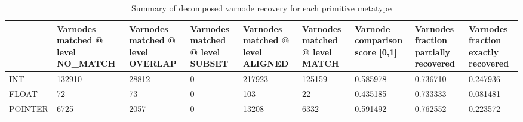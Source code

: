 \begin{table}[t]
\centering
\caption{Summary of decomposed varnode recovery for each primitive metatype}
\label{table:metatype-recovery-summary-with-levels-decomposed}
\begin{tabular}{lp{2.2cm}p{2.2cm}p{2.2cm}p{2.2cm}p{2.2cm}p{2.2cm}p{2.2cm}p{2.2cm}}
\toprule
{} &  Varnodes matched @ level NO\_MATCH &  Varnodes matched @ level OVERLAP &  Varnodes matched @ level SUBSET &  Varnodes matched @ level ALIGNED &  Varnodes matched @ level MATCH &  Varnode comparison score [0,1] &  Varnodes fraction partially recovered &  Varnodes fraction exactly recovered \\
\midrule
INT     &                             132910 &                             28812 &                                0 &                            217923 &                          125159 &                        0.585978 &                               0.736710 &                             0.247936 \\
FLOAT   &                                 72 &                                73 &                                0 &                               103 &                              22 &                        0.435185 &                               0.733333 &                             0.081481 \\
POINTER &                               6725 &                              2057 &                                0 &                             13208 &                            6332 &                        0.591492 &                               0.762552 &                             0.223572 \\
\bottomrule
\end{tabular}
\end{table}
